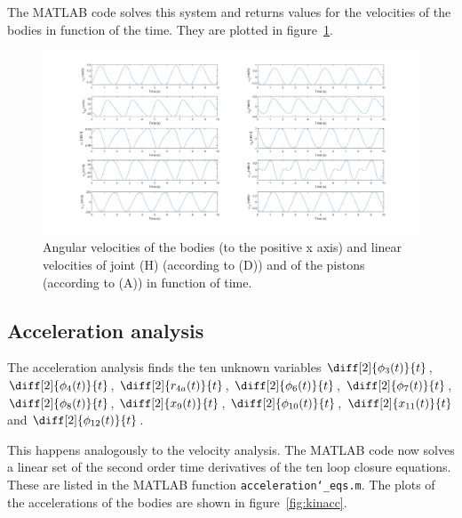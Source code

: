 \documentclass[a4paper]{article}
\begin{document}
The MATLAB code solves this system and returns values for the velocities of the bodies in function of the time. They are plotted in figure~\ref{fig:kinvel}.

\begin{figure}[h]
	\centering
	
	\includegraphics[width = \textwidth]{kinvel.png}
	
	\caption{Angular velocities of the bodies (to the positive x axis) and linear velocities of joint (H) (according to (D)) and of the pistons (according to (A)) in function of time.}
	\label{fig:kinvel}
	
\end{figure}

\newpage

\subsection{Acceleration analysis}

The acceleration analysis finds the ten unknown variables \(\diff[2]{\phi_3(t)}{t}\), \(\diff[2]{\phi_4(t)}{t}\), \(\diff[2]{r_{4a}(t)}{t}\), \(\diff[2]{\phi_6(t)}{t}\), \(\diff[2]{\phi_7(t)}{t}\), \(\diff[2]{\phi_8(t)}{t}\), \(\diff[2]{x_9(t)}{t}\), \(\diff[2]{\phi_{10}(t)}{t}\), \(\diff[2]{x_{11}(t)}{t}\) and \(\diff[2]{\phi_{12}(t)}{t}\).

This happens analogously to the velocity analysis. The MATLAB code now solves a linear set of the second order time derivatives of the ten loop closure equations. These are listed in the MATLAB function \texttt{acceleration\char`_eqs.m}. The plots of the accelerations of the bodies are shown in figure~\ref{fig:kinacc}.
\end{document}
